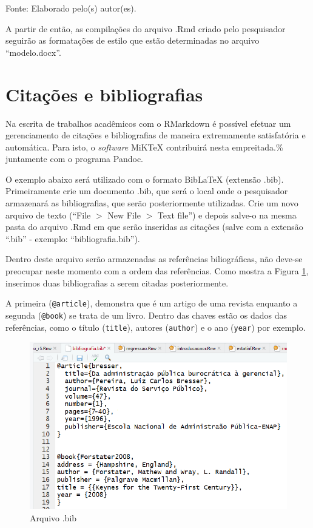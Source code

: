 \documentclass[12pt,brazil,oneside]{book}
\begin{document}
Fonte: Elaborado pelo(s) autor(es).

A partir de então, as compilações do arquivo .Rmd criado pelo
pesquisador seguirão as formatações de estilo que estão determinadas no
arquivo ``modelo.docx''.

\hypertarget{citacoes-e-bibliografias}{%
\section{Citações e bibliografias}\label{citacoes-e-bibliografias}}

Na escrita de trabalhos acadêmicos com o RMarkdown é possível efetuar um
gerenciamento de citações e bibliografias de maneira extremamente
satisfatória e automática. Para isto, o \emph{software} MiKTeX
contribuirá nesta empreitada.\% juntamente com o programa Pandoc.

O exemplo abaixo será utilizado com o formato BibLaTeX (extensão .bib).
Primeiramente crie um documento .bib, que será o local onde o
pesquisador armazenará as bibliografias, que serão posteriormente
utilizadas. Crie um novo arquivo de texto (``File \(>\) New File \(>\)
Text file'') e depois salve-o na mesma pasta do arquivo .Rmd em que
serão inseridas as citações (salve com a extensão ``.bib'' - exemplo:
``bibliografia.bib'').

Dentro deste arquivo serão armazenadas as referências biliográficas, não
deve-se preocupar neste momento com a ordem das referências. Como mostra
a Figura \ref{fig:rmarkbib}, inserimos duas bibliografias a serem
citadas posteriormente.

A primeira (\texttt{@article}), demonstra que é um artigo de uma revista
enquanto a segunda (\texttt{@book}) se trata de um livro. Dentro das
chaves estão os dados das referências, como o título (\texttt{title}),
autores (\texttt{author}) e o ano (\texttt{year}) por exemplo.

\begin{figure}[H]

{\centering \includegraphics[width=0.8\linewidth]{rmarkbib} 

}

\caption{Arquivo .bib}\label{fig:rmarkbib}
\end{figure}
\end{document}
